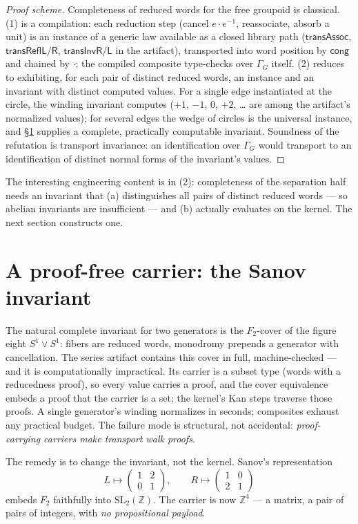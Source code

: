 \documentclass[11pt]{amsart}
\theoremstyle{definition}
\newcommand{\cng}{\mathsf{cong}}
\newcommand{\trns}{\mathbin{\cdot}}
\newcommand{\Ftwo}{F_2}
\newcommand{\SL}{\mathrm{SL}_2(\mathbb{Z})}
\newcommand{\Sone}{S^1}
\begin{document}
\begin{proof}[Proof scheme]
  Completeness of reduced words for the free groupoid is classical.
  (1) is a compilation: each reduction step (cancel $e \trns
  e^{-1}$, reassociate, absorb a unit) is an instance of a generic
  law available as a closed library path
  ($\mathsf{transAssoc}$, $\mathsf{transReflL/R}$,
  $\mathsf{transInvR/L}$ in the artifact), transported into word
  position by $\cng$ and chained by $\trns$; the compiled composite
  type-checks over $\Gamma_G$ itself.  (2) reduces to exhibiting,
  for each pair of distinct reduced words, an instance and an
  invariant with distinct computed values.  For a single edge
  instantiated at the circle, the winding invariant computes
  ($+1$, $-1$, $0$, $+2$, \dots{} are among the artifact's
  normalized values); for several edges the wedge of circles is the
  universal instance, and \S\ref{sec:sanov} supplies a complete,
  practically computable invariant.  Soundness of the refutation is
  transport invariance: an identification over $\Gamma_G$ would
  transport to an identification of distinct normal forms of the
  invariant's values.
\end{proof}

The interesting engineering content is in (2): completeness of the
separation half needs an invariant that (a) distinguishes all pairs
of distinct reduced words --- so abelian invariants are insufficient
--- and (b) actually evaluates on the kernel.  The next section
constructs one.

\section{A proof-free carrier: the Sanov invariant}
\label{sec:sanov}

The natural complete invariant for two generators is the
$\Ftwo$-cover of the figure eight $\Sone \vee \Sone$: fibers are
reduced words, monodromy prepends a generator with cancellation.
The series artifact contains this cover in full, machine-checked
--- and it is computationally impractical.  Its carrier is a
subset type (words with a reducedness proof), so every value carries
a proof, and the cover equivalence embeds a proof that the carrier
is a set; the kernel's Kan steps traverse those proofs.  A single
generator's winding normalizes in seconds; composites exhaust any
practical budget.  The failure mode is structural, not accidental:
\emph{proof-carrying carriers make transport walk proofs}.

The remedy is to change the invariant, not the kernel.  Sanov's
representation \cite{Sanov}
\[
  L \mapsto \begin{pmatrix}1 & 2\\ 0 & 1\end{pmatrix},
  \qquad
  R \mapsto \begin{pmatrix}1 & 0\\ 2 & 1\end{pmatrix}
\]
embeds $\Ftwo$ faithfully into $\SL$.  The carrier is now
$\mathbb{Z}^4$ --- a matrix, a pair of pairs of integers, with
\emph{no propositional payload}.
\end{document}
